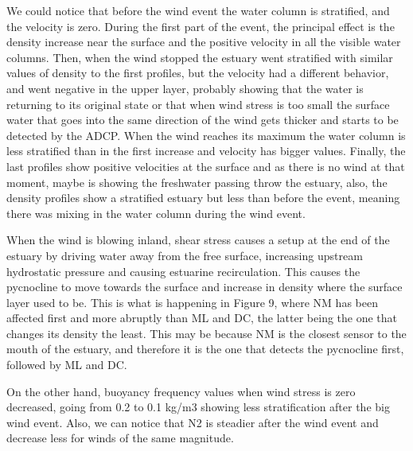 \documentclass[tesis.tex]{subfiles}
\begin{document}
    
    We could notice that before the wind event the water column is stratified, and the velocity is zero. During the first part of the event, the principal effect is the density increase near the surface and the positive velocity in all the visible water columns. Then, when the wind stopped the estuary went stratified with similar values of density to the first profiles, but the velocity had a different behavior, and went negative in the upper layer, probably showing that the water is returning to its original state or that when wind stress is too small the surface water that goes into the same direction of the wind gets thicker and starts to be detected by the ADCP. When the wind reaches its maximum the water column is less stratified than in the first increase and velocity has bigger values. Finally, the last profiles show positive velocities at the surface and as there is no wind at that moment, maybe is showing the freshwater passing throw the estuary, also, the density profiles show a stratified estuary but less than before the event, meaning there was mixing in the water column during the wind event.
    
    When the wind is blowing inland, shear stress causes a setup at the end of the estuary by driving water away from the free surface, increasing upstream hydrostatic pressure and causing estuarine recirculation. This causes the pycnocline to move towards the surface and increase in density where the surface layer used to be. This is what is happening in Figure 9, where NM has been affected first and more abruptly than ML and DC, the latter being the one that changes its density the least. This may be because NM is the closest sensor to the mouth of the estuary, and therefore it is the one that detects the pycnocline first, followed by ML and DC.
    
    On the other hand, buoyancy frequency values when wind stress is zero decreased, going from 0.2 to 0.1 kg/m3  showing less stratification after the big wind event. Also, we can notice that N2 is steadier after the wind event and decrease less for winds of the same magnitude.
    
    
\end{document}
